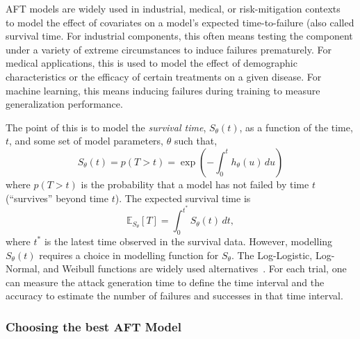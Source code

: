 \documentclass[conference]{IEEEtran}
\begin{document}
{AFT models are widely used in industrial, medical, or risk-mitigation contexts~\cite{kleinbaum1996survival, aft_models} to model the effect of covariates on a model's expected time-to-failure (also called survival time. For industrial components, this often means testing the component under a variety  of extreme circumstances to induce failures prematurely. For medical applications, this is used to model the effect of demographic characteristics or the efficacy of certain treatments on a given disease. For machine learning, this means inducing failures during training to measure generalization performance.

The point of this is to model the \textit{survival time}, $S_{\theta}(t)$, as a function of the time, $t$,  and some set of model parameters, $\theta$ such that,
$$
    S_{\theta}(t) = p(T>t) = \exp\left(-\int_0^t h_{\theta}(u) \, du\right)
$$
where $p(T>t)$ is the probability that a model has not failed by time $t$ (``survives'' beyond time $t$). The expected survival time is
\[
	\mathbb{E}_{S_\theta}[T] = \int_0^{t^*}  S_\theta(t) \,dt,
\]
where $t^*$ is the latest time observed in the survival data. However, modelling $S_{\theta}(t)$ requires a choice in modelling function for $S_{\theta}$. The Log-Logistic, Log-Normal, and Weibull functions are widely used alternatives~\cite{kleinbaum1996survival,meyers_aft}. For each trial, one can measure the attack generation time to define the time interval and the accuracy to estimate the number of failures and successes in that time interval. 

\subsubsection{Choosing the best AFT Model}

}
\end{document}
